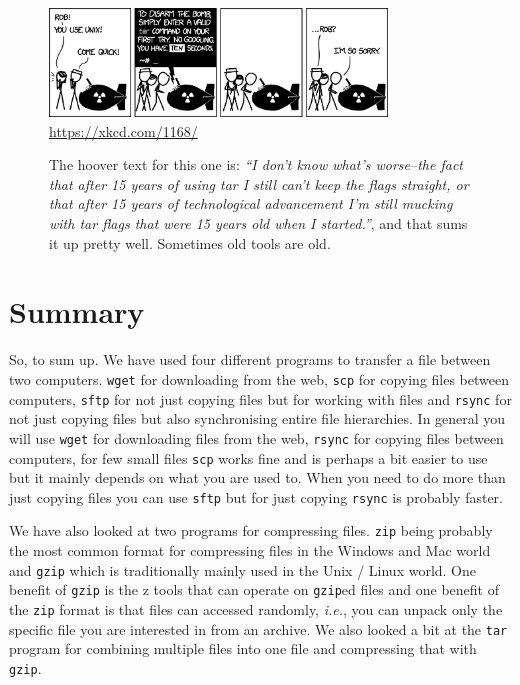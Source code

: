 \documentclass[watermark]{pbpreprint}
\begin{document}
\begin{figure}[bht]
    \centering
    \includegraphics[width=0.8\textwidth]{Figures/xkcd_tar.png}\\
    \url{https://xkcd.com/1168/}
    \caption{The hoover text for this one is: \textit{``I don't know what's worse--the
    fact that after 15 years of using tar I still can't keep the flags
    straight, or that after 15 years of technological advancement I'm still
    mucking with tar flags that were 15 years old when I started.''}, and that
    sums it up pretty well. Sometimes old tools are old.\label{xkcdtar}}
\end{figure}

\section{Summary}
So, to sum up. We have used four different programs to transfer a file between
two computers. \texttt{wget} for downloading from the web,  \texttt{scp} for
copying files between computers, \texttt{sftp} for not just copying files but
for working with files and \texttt{rsync} for not just copying files but also
synchronising entire file hierarchies. In general you will use \texttt{wget}
for downloading files from the web, \texttt{rsync} for copying files between
computers, for few small files \texttt{scp} works fine and is perhaps a bit
easier to use but it mainly depends on what you are used to. When you need to
do more than just copying files you can use \texttt{sftp} but for just copying
\texttt{rsync} is probably faster.

We have also looked at two programs for compressing files. \texttt{zip} being
probably the most common format for compressing files in the Windows and Mac
world and \texttt{gzip} which is traditionally mainly used in the Unix / Linux
world. One benefit of \texttt{gzip} is the z tools that can operate on
\texttt{gzip}ed files and one benefit of the \texttt{zip} format is that files
can accessed randomly, \textit{i.e.}, you can unpack only the specific file you
are interested in from an archive. We also looked a bit at the \texttt{tar}
program for combining multiple files into one file and compressing that with
\texttt{gzip}.
\end{document}
